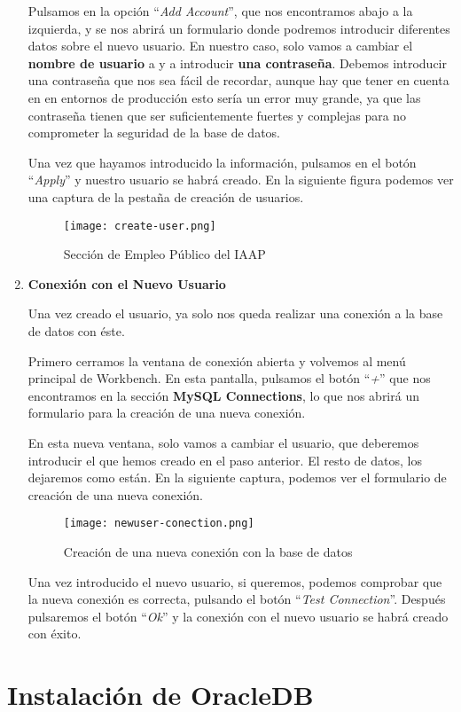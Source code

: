 \begin{enumerate}
    Pulsamos en la opción ``\textit{Add Account}'', que nos encontramos abajo a la izquierda, y se nos abrirá un formulario donde podremos introducir diferentes datos sobre el nuevo usuario. En nuestro caso, solo vamos a cambiar el \textbf{nombre de usuario} a y a introducir \textbf{una contraseña}. Debemos introducir una contraseña que nos sea fácil de recordar, aunque hay que tener en cuenta en en entornos de producción esto sería un error muy grande, ya que las contraseña tienen que ser suficientemente fuertes y complejas para no comprometer la seguridad de la base de datos.

    Una vez que hayamos introducido la información, pulsamos en el botón ``\textit{Apply}'' y nuestro usuario se habrá creado. En la siguiente figura podemos ver una captura de la pestaña de creación de usuarios.

    \newpage

    \begin{figure}[ht]
        \centering
        \texttt{[image: create-user.png]}
        \caption{Sección de Empleo Público del IAAP}
        \label{fig:create}
    \end{figure}

    \item \textbf{Conexión con el Nuevo Usuario}

    Una vez creado el usuario, ya solo nos queda realizar una conexión a la base de datos con éste.

    Primero cerramos la ventana de conexión abierta y volvemos al menú principal de Workbench. En esta pantalla, pulsamos el botón ``\textit{+}'' que nos encontramos en la sección \textbf{MySQL Connections}, lo que nos abrirá un formulario para la creación de una nueva conexión.

    En esta nueva ventana, solo vamos a cambiar el usuario, que deberemos introducir el que hemos creado en el paso anterior. El resto de datos, los dejaremos como están. En la siguiente captura, podemos ver el formulario de creación de una nueva conexión.

   \begin{figure}[ht]
        \centering
        \texttt{[image: newuser-conection.png]}
        \caption{Creación de una nueva conexión con la base de datos}
    \end{figure}

    Una vez introducido el nuevo usuario, si queremos, podemos comprobar que la nueva conexión es correcta, pulsando el botón ``\textit{Test Connection}''. Después pulsaremos el botón ``\textit{Ok}'' y la conexión con el nuevo usuario se habrá creado con éxito.
\end{enumerate}

\section{Instalación de OracleDB}







\newpage



